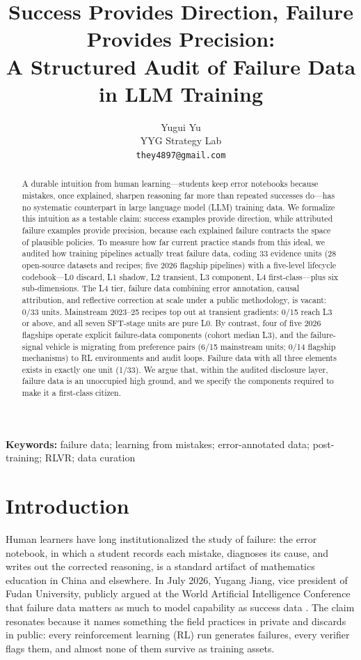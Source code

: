 \documentclass[10pt]{article}
\title{\textbf{Success Provides Direction, Failure Provides Precision:\\
A Structured Audit of Failure Data in LLM Training}}
\author{Yugui Yu\\
YYG Strategy Lab\\
\texttt{they4897@gmail.com}
}
\date{}
\begin{document}
\maketitle

\begin{abstract}
\noindent A durable intuition from human learning---students keep error notebooks because mistakes, once explained, sharpen reasoning far more than repeated successes do---has no systematic counterpart in large language model (LLM) training data. We formalize this intuition as a testable claim: success examples provide direction, while attributed failure examples provide precision, because each explained failure contracts the space of plausible policies. To measure how far current practice stands from this ideal, we audited how training pipelines actually treat failure data, coding 33 evidence units (28 open-source datasets and recipes; five 2026 flagship pipelines) with a five-level lifecycle codebook---L0 discard, L1 shadow, L2 transient, L3 component, L4 first-class---plus six sub-dimensions. The L4 tier, failure data combining error annotation, causal attribution, and reflective correction at scale under a public methodology, is vacant: 0/33 units. Mainstream 2023--25 recipes top out at transient gradients: 0/15 reach L3 or above, and all seven SFT-stage units are pure L0. By contrast, four of five 2026 flagships operate explicit failure-data components (cohort median L3), and the failure-signal vehicle is migrating from preference pairs (6/15 mainstream units; 0/14 flagship mechanisms) to RL environments and audit loops. Failure data with all three elements exists in exactly one unit (1/33). We argue that, within the audited disclosure layer, failure data is an unoccupied high ground, and we specify the components required to make it a first-class citizen.
\end{abstract}

\medskip
\noindent\textbf{Keywords:} failure data; learning from mistakes; error-annotated data; post-training; RLVR; data curation

\section{Introduction}

Human learners have long institutionalized the study of failure: the error notebook, in which a student records each mistake, diagnoses its cause, and writes out the corrected reasoning, is a standard artifact of mathematics education in China and elsewhere. In July 2026, Yugang Jiang, vice president of Fudan University, publicly argued at the World Artificial Intelligence Conference that failure data matters as much to model capability as success data \cite{waic2026}. The claim resonates because it names something the field practices in private and discards in public: every reinforcement learning (RL) run generates failures, every verifier flags them, and almost none of them survive as training assets.
\end{document}

